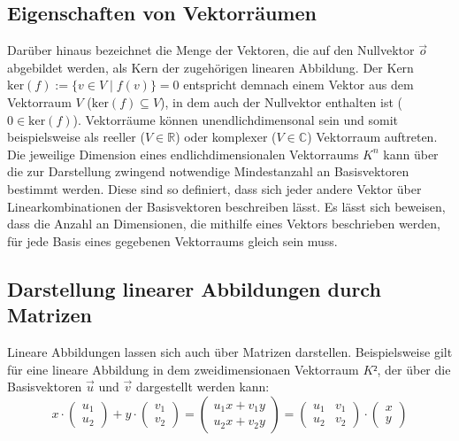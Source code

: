 \documentclass[]{dsadokumentation}
\begin{document}
\subsection{Eigenschaften von Vektorräumen}
Darüber hinaus bezeichnet die Menge der Vektoren, die auf den Nullvektor $\vec{o}$ abgebildet werden, als Kern der zugehörigen linearen Abbildung. Der Kern $\mathrm{ker}(f):= \{v \in V \; \big\vert \; f(v) \} = 0$ entspricht demnach einem Vektor aus dem Vektorraum $V$ ($\mathrm{ker}(f) \subseteq V$), in dem auch der Nullvektor enthalten ist ($0 \in \mathrm{ker}(f)$). Vektorräume können unendlichdimensonal sein und somit beispielsweise als reeller ($V \in \mathbb{R}$) oder komplexer ($V \in \mathbb{C}$) Vektorraum auftreten. Die jeweilige Dimension eines endlichdimensionalen Vektorraums $K^n$ kann über die zur Darstellung zwingend notwendige Mindestanzahl an Basisvektoren bestimmt werden. Diese sind so definiert, dass sich jeder andere Vektor über Linearkombinationen der Basisvektoren beschreiben lässt. Es lässt sich beweisen, dass die Anzahl an Dimensionen, die mithilfe eines Vektors beschrieben werden, für jede Basis eines gegebenen Vektorraums gleich sein muss.\\

\subsection{Darstellung linearer Abbildungen durch Matrizen}
Lineare Abbildungen lassen sich auch über Matrizen darstellen. Beispielsweise gilt für eine lineare Abbildung in dem zweidimensionaen Vektorraum $K²$, der über die Basisvektoren $\vec{u}$ und $\vec{v}$ dargestellt werden kann:
\[x \cdot \left(\begin{array}{c} u_1 \\ u_2 \end{array}\right) + y \cdot \left(\begin{array}{c} v_1 \\ v_2 \end{array}\right) = \left(\begin{array}{c} u_1 x + v_1 y \\ u_2 x + v_2 y \end{array}\right) = \left( \begin{array}{rr} u_1 & v_1 \\ u_2 & v_2 \end{array}\right) \cdot \left(\begin{array}{c} x \\ y \end{array}\right) \]
\end{document}
